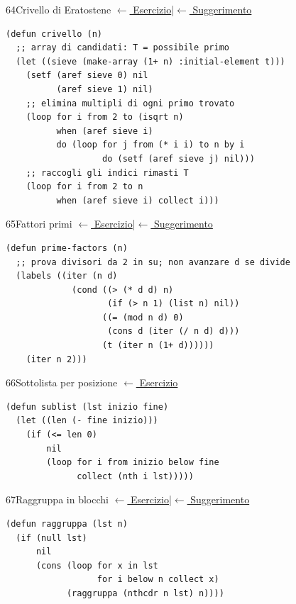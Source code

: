 \label{sol:64}
\begin{solbox}{64}{Crivello di Eratostene}
\small\color{black!55}\hyperref[ex:64]{$\leftarrow$ Esercizio}\enspace\textcolor{black!30}{|}\enspace\hyperref[hint:64]{$\leftarrow$ Suggerimento}\normalsize\color{black}
\begin{lstlisting}
(defun crivello (n)
  ;; array di candidati: T = possibile primo
  (let ((sieve (make-array (1+ n) :initial-element t)))
    (setf (aref sieve 0) nil
          (aref sieve 1) nil)
    ;; elimina multipli di ogni primo trovato
    (loop for i from 2 to (isqrt n)
          when (aref sieve i)
          do (loop for j from (* i i) to n by i
                   do (setf (aref sieve j) nil)))
    ;; raccogli gli indici rimasti T
    (loop for i from 2 to n
          when (aref sieve i) collect i)))
\end{lstlisting}
\end{solbox}

\label{sol:65}
\begin{solbox}{65}{Fattori primi}
\small\color{black!55}\hyperref[ex:65]{$\leftarrow$ Esercizio}\enspace\textcolor{black!30}{|}\enspace\hyperref[hint:65]{$\leftarrow$ Suggerimento}\normalsize\color{black}
\begin{lstlisting}
(defun prime-factors (n)
  ;; prova divisori da 2 in su; non avanzare d se divide
  (labels ((iter (n d)
             (cond ((> (* d d) n)
                    (if (> n 1) (list n) nil))
                   ((= (mod n d) 0)
                    (cons d (iter (/ n d) d)))
                   (t (iter n (1+ d))))))
    (iter n 2)))
\end{lstlisting}
\end{solbox}

\label{sol:66}
\begin{solbox}{66}{Sottolista per posizione}
\small\color{black!55}\hyperref[ex:66]{$\leftarrow$ Esercizio}\normalsize\color{black}
\begin{lstlisting}
(defun sublist (lst inizio fine)
  (let ((len (- fine inizio)))
    (if (<= len 0)
        nil
        (loop for i from inizio below fine
              collect (nth i lst)))))
\end{lstlisting}
\end{solbox}

\label{sol:67}
\begin{solbox}{67}{Raggruppa in blocchi}
\small\color{black!55}\hyperref[ex:67]{$\leftarrow$ Esercizio}\enspace\textcolor{black!30}{|}\enspace\hyperref[hint:67]{$\leftarrow$ Suggerimento}\normalsize\color{black}
\begin{lstlisting}
(defun raggruppa (lst n)
  (if (null lst)
      nil
      (cons (loop for x in lst
                  for i below n collect x)
            (raggruppa (nthcdr n lst) n))))
\end{lstlisting}
\end{solbox}

